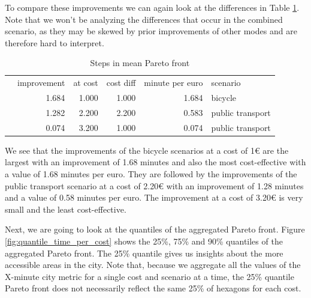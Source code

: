 To compare these improvements we can again look at the differences in Table \ref{tab:differences_in_mean_pareto_front}.
Note that we won't be analyzing the differences that occur in the combined scenario, as they may be skewed by prior improvements of other modes and are therefore hard to interpret.

\begin{table}
  \caption{Steps in mean Pareto front}
  \label{tab:differences_in_mean_pareto_front}
  \begin{center}
    \begin{tabular}{lrrrrl}
     & improvement & at cost & cost diff & minute per euro & scenario \\
     & 1.684 & 1.000 & 1.000 & 1.684 & bicycle \\
     & 1.282 & 2.200 & 2.200 & 0.583 & public transport \\
     & 0.074 & 3.200 & 1.000 & 0.074 & public transport \\
    \end{tabular}
  \end{center}
\end{table}

We see that the improvements of the bicycle scenarios at a cost of 1€ are the largest with an improvement of 1.68 minutes and also the most cost-effective with a value of 1.68 minutes per euro.
They are followed by the improvements of the public transport scenario at a cost of 2.20€ with an improvement of 1.28 minutes and a value of 0.58 minutes per euro.
The improvement at a cost of 3.20€ is very small and the least cost-effective.

Next, we are going to look at the quantiles of the aggregated Pareto front.
Figure \ref{fig:quantile_time_per_cost} shows the 25\%, 75\% and 90\% quantiles of the aggregated Pareto front.
The 25\% quantile gives us insights about the more accessible areas in the city.
Note that, because we aggregate all the values of the X-minute city metric for a single cost and scenario at a time, the 25\% quantile Pareto front does not necessarily reflect the same 25\% of hexagons for each cost.

